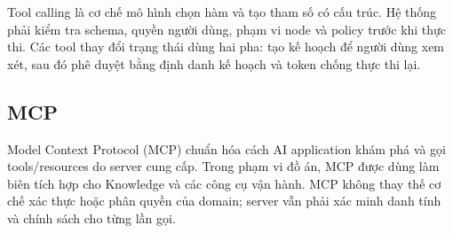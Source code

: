 Tool calling là cơ chế mô hình chọn hàm và tạo tham số có cấu trúc. Hệ thống phải
kiểm tra schema, quyền người dùng, phạm vi node và policy trước khi thực thi. Các
tool thay đổi trạng thái dùng hai pha: tạo kế hoạch để người dùng xem xét, sau đó
phê duyệt bằng định danh kế hoạch và token chống thực thi lại.

\subsection{MCP}

Model Context Protocol (MCP) chuẩn hóa cách AI application khám phá và gọi
tools/resources do server cung cấp. Trong phạm vi đồ án, MCP được dùng làm biên
tích hợp cho Knowledge và các công cụ vận hành. MCP không thay thế cơ chế xác
thực hoặc phân quyền của domain; server vẫn phải xác minh danh tính và chính
sách cho từng lần gọi.